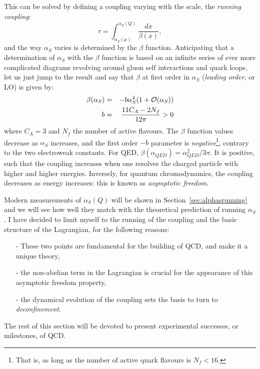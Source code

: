 This can be solved by defining a coupling varying with the scale, the
\emph{running coupling}:
\begin{equation}
\tau = \int_{\alpha_{S}(\mu)}^{\alpha_{S}(Q)} \frac{dx}{\beta(x)},
\end{equation}
and the way $\alpha_{S}$ varies is determined by the $\beta$
function. Anticipating that a determination of $\alpha_{S}$ with the
$\beta$ function is based on
an infinite series of ever more complicated diagrams revolving around
gluon self interactions and quark loops, let us just jump to the
result and say that $\beta$ at first order in $\alpha_{S}$ (\textit{leading
order}, or LO) is given by:
\begin{eqnarray}
\beta(\alpha_{S}) &=& -b \alpha^{2}_{S}(1 +\mathcal{O}(\alpha_{S}))\\
\vspace{0.5cm}
b &=& \frac{11 C_{A} - 2 N_{f}}{12\pi} > 0
\end{eqnarray}
where $C_A=3$ and $N_f$ the number of active flavours. The $\beta$ function values decrease as
$\alpha_{S}$ increases, and
the first order $-b$ parameter is \textit{negative}\footnote{That is,
  as long as the number of active quark flavours is $N_f < 16$.}, contrary to the two electroweak constants. For QED,
$\beta(\alpha_{QED})=\alpha_{QED}^{2}/3\pi$. It is positive, such that
the coupling increases when one resolves the charged particle with higher
and higher energies. Inversely, for quantum chromodynamics, the
coupling decreases as energy increases: this is known as \emph{asymptotic
freedom}.

Modern measurements of $\alpha_S(Q)$ will be shown in
Section~\ref{sec:alphasrunning} and we will see how well they match
with the theoretical prediction of running $\alpha_S$. 
I have decided to limit myself to the running of the coupling and
the basic structure of the Lagrangian, for the following reasons:
\begin{itemize}
\item[-] These two points are fundamental for the building of QCD, and
  make it a unique theory,
\item[-] the non-abelian term in the Lagrangian is crucial for the
  appearance of this asymptotic freedom property,
\item[-] the dynamical evolution of the coupling
  sets the basis to turn to \emph{deconfinement}.
\end{itemize}

The rest of this section will be devoted to present experimental
successes, or milestones, of QCD. 

